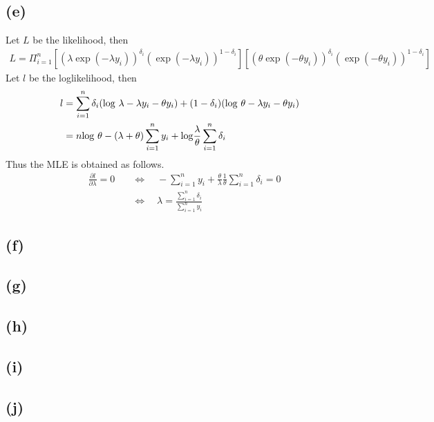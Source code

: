 \documentclass{article}
\begin{document}
\subsection{(e)}
Let $L$ be the likelihood, then
\begin{align*}
	L = \Pi_{i=1}^n \left[ (\lambda \exp(-\lambda y_i))^{\delta_i} (\exp(-\lambda y_i))^{1-\delta_i} \right] \left[ (\theta \exp(-\theta y_i))^{\delta_i} (\exp(-\theta y_i))^{1-\delta_i} \right]
\end{align*}
Let $l$ be the loglikelihood, then
\begin{align*}
	l &= \sum_{i=1}^n \delta_i ({\rm log}\ \lambda - \lambda y_i - \theta y_i) + (1 - \delta_i) ({\rm log}\ \theta - \lambda y_i - \theta y_i)\\
	&= n {\rm log}\ \theta - (\lambda+\theta) \sum_{i=1}^n y_i + {\rm log} \frac{\lambda}{\theta} \sum_{i=1}^n \delta_i
\end{align*}
Thus the MLE is obtained as follows.
\begin{align*}
	\quad \frac{\partial l}{\partial \lambda} = 0 &\quad \Leftrightarrow \quad -\sum_{i=1}^n y_i + \frac{\theta}{\lambda} \frac{1}{\theta} \sum_{i=1}^n \delta_i = 0 \\[10pt]
	&\quad \Leftrightarrow \quad \lambda = \frac{\sum_{i=1}^n \delta_i}{\sum_{i=1}^n y_i}
\end{align*}

\subsection{(f)}
\subsection{(g)}
\subsection{(h)}
\subsection{(i)}
\subsection{(j)}
\end{document}
